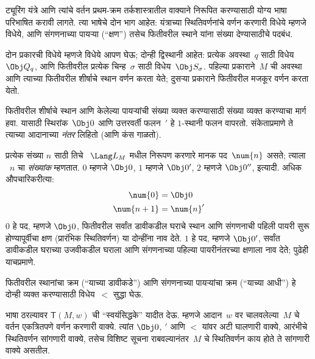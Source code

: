 \begin{explain}
ट्यूरिंग यंत्रे आणि त्यांचे वर्तन प्रथम-क्रम तर्कशास्त्रातील
वाक्याने निरूपित करण्यासाठी योग्य भाषा
परिभाषित करावी लागते. त्या भाषेचे दोन भाग आहेत:
यंत्राच्या स्थितिवर्णनांचे वर्णन करणारी विधेये
म्हणजे विधेये, आणि संगणनाच्या पायऱ्या (“क्षण”)
तसेच फितीवरील स्थाने यांना संख्या देण्यासाठीचे
पदबंध.

दोन प्रकारची विधेये म्हणजे विधेये
आपण घेऊ; दोन्ही द्विस्थानी आहेत: प्रत्येक
अवस्था~$q$ साठी विधेय~$\Obj Q_q$,
आणि फितीवरील प्रत्येक चिन्ह~$\sigma$
साठी विधेय~$\Obj S_\sigma$.
पहिल्या प्रकाराने~$M$ ची अवस्था आणि
त्याच्या फितीवरील शीर्षाचे स्थान वर्णन
करता येते; दुसऱ्या प्रकाराने फितीवरील
मजकूर वर्णन करता येतो.

फितीवरील शीर्षाचे स्थान आणि केलेल्या
पायऱ्यांची संख्या व्यक्त करण्यासाठी
संख्या व्यक्त करण्याचा मार्ग हवा.
यासाठी स्थिरांक~$\Obj 0$
आणि उत्तरवर्ती फलन~$\prime$ हे
$1$-स्थानी फलन वापरतो. संकेताप्रमाणे
ते त्याच्या आदानाच्या \emph{नंतर}
लिहितो (आणि कंस गाळतो).

प्रत्येक संख्या $n$ साठी तिचे
~$\Lang L_M$ मधील निरूपण करणारे
मानक पद~$\num{n}$ असते; त्याला
~$n$ चा \emph{संख्यांक} म्हणतात.
$\num{0}$ म्हणजे $\Obj 0$,
$\num{1}$ म्हणजे $\Obj 0'$,
$\num{2}$ म्हणजे $\Obj 0''$,
इत्यादी. अधिक औपचारिकरीत्या:
\begin{align*}
\num{0} & = \Obj 0 \\
\num{n+1} &= \num{n}'
\end{align*}
$\num{0}$ हे पद, म्हणजे $\Obj 0$,
फितीवरील सर्वांत डावीकडील घराचे स्थान
आणि संगणनाची पहिली पायरी सुरू होण्यापूर्वीचा
क्षण (प्रारंभिक स्थितिवर्णन) या दोन्हींना
नाव देते. $\num{1}$ हे पद, म्हणजे
$\Obj 0'$, सर्वांत डावीकडील घराच्या
उजवीकडील घराला आणि संगणनाच्या
पहिल्या पायरीनंतरच्या क्षणाला नाव
देते; पुढेही याचप्रमाणे.

फितीवरील स्थानांचा क्रम (“याच्या डावीकडे”)
आणि संगणनाच्या पायऱ्यांचा क्रम (“याच्या
आधी”) हे दोन्ही व्यक्त करण्यासाठी
विधेय~$<$ सुद्धा घेऊ.

भाषा ठरल्यावर $\mathsf{T}(M,
w)$ ची “स्वयंसिद्धके” यादीत देऊ.
म्हणजे आदान~$w$ वर चालवलेल्या~$M$
चे वर्तन एकत्रितपणे वर्णन करणारी
वाक्ये. त्यांत
$\Obj 0$, $\prime$ आणि $<$ यांवर
अटी घालणारी वाक्ये,
आरंभीचे स्थितिवर्णन सांगणारी
वाक्ये, तसेच विशिष्ट सूचना
राबवल्यानंतर~$M$ चे स्थितिवर्णन
काय होते ते सांगणारी वाक्ये
असतील.
\end{explain}

